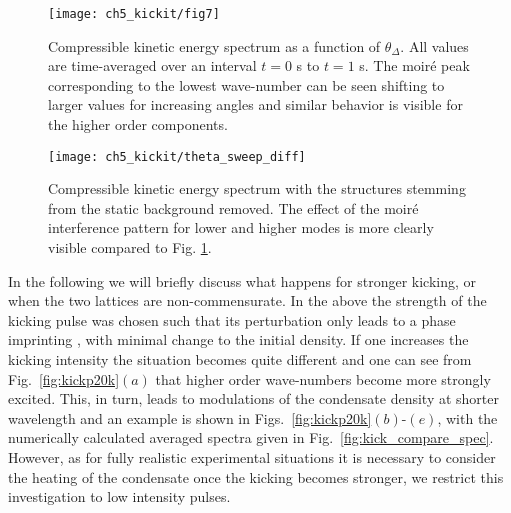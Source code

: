 
	\begin{figure}
        \centering
		\texttt{[image: ch5\_kickit/fig7]}
		\caption[Compressible kinetic energy spectrum as a function of $\theta_\Delta$.]{Compressible kinetic energy spectrum as a function of $\theta_\Delta$. All values are time-averaged over an interval $t=0$ s to $t=1$ s. The moir\'e peak corresponding to the lowest wave-number can be seen shifting to larger values for increasing angles and similar behavior is visible for the higher order components.}
		\label{fig:dtheta_kspec}
	\end{figure}
    \begin{figure}
        \centering
        \texttt{[image: ch5\_kickit/theta\_sweep\_diff]}
        \caption[Compressible kinetic energy spectrum with the background structure removed.]{Compressible kinetic energy spectrum with the structures stemming from the static background removed. The effect of the moir\'e interference pattern for lower and higher modes is more clearly visible compared to Fig. \ref{fig:dtheta_kspec}.}
        \label{fig:dtheta_kspec_backg}
    \end{figure}

    In the following we will briefly discuss what happens for stronger kicking, or when the two lattices are non-commensurate. In the above the strength of the kicking pulse was chosen such that its perturbation only leads to a phase imprinting \cite{Vtx:Dobrek_pra_1999,BEC:Denschlag_science_2000}, with minimal change to the initial density. If one increases the kicking intensity the situation becomes quite different and one can see from Fig.~\ref{fig:kickp20k}$(a)$ that higher order wave-numbers become more strongly excited. This, in turn, leads to modulations of the condensate density at shorter wavelength and an example is shown in Figs.~\ref{fig:kickp20k}$(b)$-$(e)$, with the numerically calculated averaged spectra given in Fig.~\ref{fig:kick_compare_spec}. However, as for fully realistic experimental situations it is necessary to consider the heating of the condensate once the kicking becomes stronger, we restrict this investigation to low intensity pulses.

